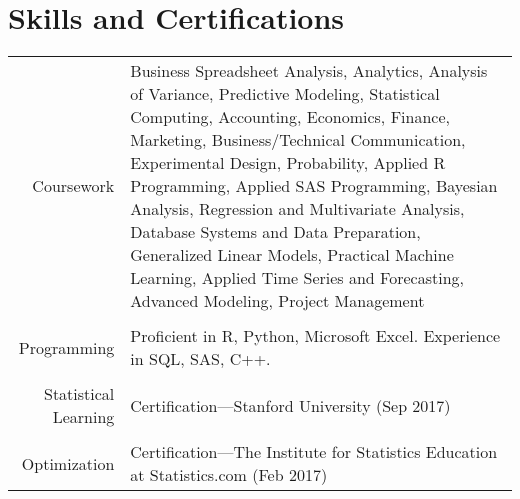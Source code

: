 \documentclass[a4paper,12pt]{article}
\begin{document}
\section{Skills and Certifications}
\begin{tabular}{rp{11cm}}
  Coursework
  & Business Spreadsheet Analysis,
  Analytics, 
  Analysis of Variance, 
  Predictive Modeling, 
  Statistical Computing,
  Accounting,
  Economics,
  Finance,
  Marketing,
  Business/Technical Communication, 
  Experimental Design,
  Probability,
  Applied R Programming,
  Applied SAS Programming,
  Bayesian Analysis,
  Regression and Multivariate Analysis,
  Database Systems and Data Preparation,
  Generalized Linear Models,
  Practical Machine Learning,
  Applied Time Series and Forecasting,
  Advanced Modeling,
  Project Management
  \\ \\
  
  Programming
  & Proficient in R, Python, Microsoft Excel. Experience in SQL, SAS, C++.\\ \\
  
  Statistical Learning
  & Certification---Stanford University (Sep 2017)\\ \\
  
  Optimization
  & Certification---The Institute for Statistics Education at Statistics.com (Feb 2017)\\
  
\end{tabular}


\end{document}
